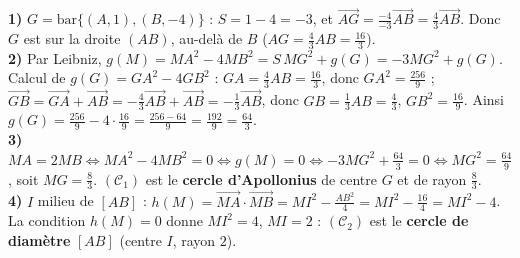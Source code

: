 \textbf{1)} $G=\mathrm{bar}\{(A,1),(B,-4)\}$ : $S=1-4=-3$, et $\overrightarrow{AG}=\frac{-4}{-3}\overrightarrow{AB}=\frac43\overrightarrow{AB}$. Donc $G$ est sur la droite $(AB)$, au-delà de $B$ ($AG=\frac43 AB=\frac{16}{3}$).\\
\textbf{2)} Par Leibniz, $g(M)=MA^2-4MB^2=S\,MG^2+g(G)=-3MG^2+g(G)$. Calcul de $g(G)=GA^2-4GB^2$ : $GA=\frac43 AB=\frac{16}3$, donc $GA^2=\frac{256}{9}$ ; $\overrightarrow{GB}=\overrightarrow{GA}+\overrightarrow{AB}=-\frac43\overrightarrow{AB}+\overrightarrow{AB}=-\frac13\overrightarrow{AB}$, donc $GB=\frac13 AB=\frac43$, $GB^2=\frac{16}{9}$. Ainsi $g(G)=\frac{256}{9}-4\cdot\frac{16}{9}=\frac{256-64}{9}=\frac{192}{9}=\frac{64}{3}$.\\
\textbf{3)} $MA=2MB\Leftrightarrow MA^2-4MB^2=0\Leftrightarrow g(M)=0\Leftrightarrow -3MG^2+\frac{64}{3}=0\Leftrightarrow MG^2=\frac{64}{9}$, soit $MG=\frac83$. $(\mathcal C_1)$ est le \textbf{cercle d'Apollonius} de centre $G$ et de rayon $\frac83$.\\
\textbf{4)} $I$ milieu de $[AB]$ : $h(M)=\overrightarrow{MA}\cdot\overrightarrow{MB}=MI^2-\frac{AB^2}{4}=MI^2-\frac{16}{4}=MI^2-4$. La condition $h(M)=0$ donne $MI^2=4$, $MI=2$ : $(\mathcal C_2)$ est le \textbf{cercle de diamètre} $[AB]$ (centre $I$, rayon $2$).
